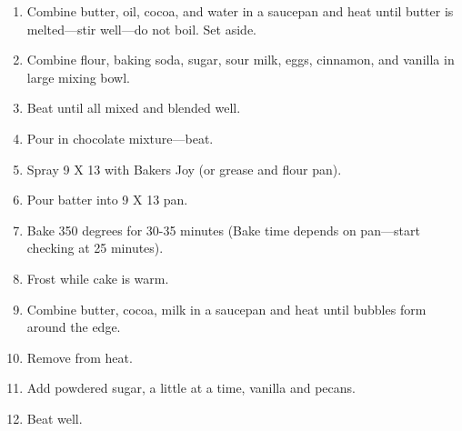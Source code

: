 \begin{footnotesize}
\begin{enumerate}
    \item Combine butter, oil, cocoa, and water in a saucepan and heat until butter is melted---stir well---do not boil.
Set aside. 
    \item Combine flour, baking soda, sugar, sour milk, eggs, cinnamon, and vanilla in large mixing bowl.
    \item Beat until all mixed and blended well.
    \item Pour in chocolate mixture—beat.
    \item Spray 9 X 13 with Bakers Joy (or grease and flour pan).
    \item Pour batter into 9 X 13 pan.
    \item Bake 350 degrees for 30-35 minutes (Bake time depends on pan---start checking at 25 minutes).
    \item Frost while cake is warm.

    \item Combine butter, cocoa, milk in a saucepan and heat until bubbles form around the edge.
    \item Remove from heat.
    \item Add powdered sugar, a little at a time, vanilla and pecans.
    \item Beat well.
\end{enumerate}
\end{footnotesize}

\vspace{2em}
